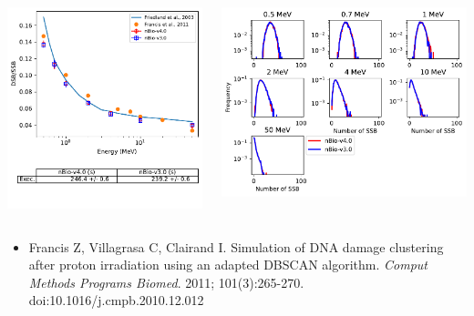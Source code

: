 \documentclass[aspectratio=1610]{beamer}
\begin{document}
\begin{frame}{\secname}
 \begin{columns}
  \begin{column}{0.4\linewidth}
   \includegraphics[width=1.1\textwidth]{./DBSCAN/DBSCAN2_TsEmDNAPhysics}
  \end{column}
  \begin{column}{0.6\linewidth} 
   \includegraphics[width=\textwidth]{./DBSCAN/DBSCAN1_TsEmDNAPhysics}
  \end{column}
 \end{columns}
\begin{itemize}
\item \tiny{Francis Z, Villagrasa C, Clairand I. Simulation of DNA damage clustering after proton irradiation using an adapted DBSCAN algorithm. \textit{Comput Methods Programs Biomed}. 2011; 101(3):265-270. doi:10.1016/j.cmpb.2010.12.012}
\end{itemize}
\end{frame}
\end{document}
